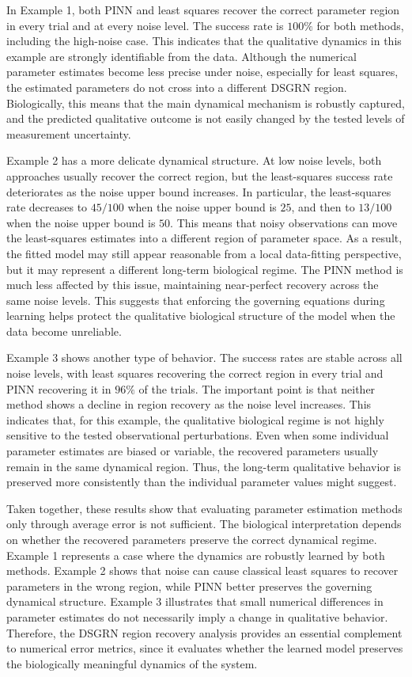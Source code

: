 \documentclass[11pt]{article}
\begin{document}
In Example 1, both PINN and least squares recover the correct parameter region in every trial and at every noise level. The success rate is \(100\%\) for both methods, including the high-noise case. This indicates that the qualitative dynamics in this example are strongly identifiable from the data. Although the numerical parameter estimates become less precise under noise, especially for least squares, the estimated parameters do not cross into a different DSGRN region. Biologically, this means that the main dynamical mechanism is robustly captured, and the predicted qualitative outcome is not easily changed by the tested levels of measurement uncertainty.

Example 2 has a more delicate dynamical structure. At low noise levels, both approaches usually recover the correct region, but the least-squares success rate deteriorates as the noise upper bound increases. In particular, the least-squares rate decreases to \(45/100\) when the noise upper bound is \(25\), and then to \(13/100\) when the noise upper bound is \(50\). This means that noisy observations can move the least-squares estimates into a different region of parameter space. As a result, the fitted model may still appear reasonable from a local data-fitting perspective, but it may represent a different long-term biological regime. The PINN method is much less affected by this issue, maintaining near-perfect recovery across the same noise levels. This suggests that enforcing the governing equations during learning helps protect the qualitative biological structure of the model when the data become unreliable.

Example 3 shows another type of behavior. The success rates are stable across all noise levels, with least squares recovering the correct region in every trial and PINN recovering it in \(96\%\) of the trials. The important point is that neither method shows a decline in region recovery as the noise level increases. This indicates that, for this example, the qualitative biological regime is not highly sensitive to the tested observational perturbations. Even when some individual parameter estimates are biased or variable, the recovered parameters usually remain in the same dynamical region. Thus, the long-term qualitative behavior is preserved more consistently than the individual parameter values might suggest.

Taken together, these results show that evaluating parameter estimation methods only through average error is not sufficient. The biological interpretation depends on whether the recovered parameters preserve the correct dynamical regime. Example 1 represents a case where the dynamics are robustly learned by both methods. Example 2 shows that noise can cause classical least squares to recover parameters in the wrong region, while PINN better preserves the governing dynamical structure. Example 3 illustrates that small numerical differences in parameter estimates do not necessarily imply a change in qualitative behavior. Therefore, the DSGRN region recovery analysis provides an essential complement to numerical error metrics, since it evaluates whether the learned model preserves the biologically meaningful dynamics of the system.


\end{document}
